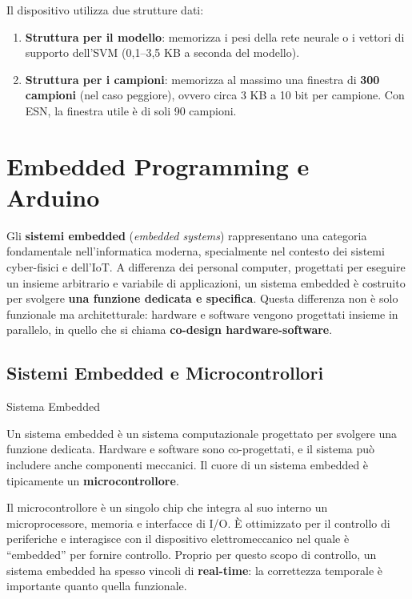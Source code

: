 \documentclass[
  italian,
  openany]{book}
\providecommand{\tightlist}{%
  \setlength{\itemsep}{0pt}\setlength{\parskip}{0pt}}
\begin{document}
Il dispositivo utilizza due strutture dati:

\begin{enumerate}
\def\labelenumi{\arabic{enumi}.}
\tightlist
\item
  \textbf{Struttura per il modello}: memorizza i pesi della rete neurale
  o i vettori di supporto dell'SVM (0,1--3,5 KB a seconda del modello).
\item
  \textbf{Struttura per i campioni}: memorizza al massimo una finestra
  di \textbf{300 campioni} (nel caso peggiore), ovvero circa 3 KB a 10
  bit per campione. Con ESN, la finestra utile è di soli 90 campioni.
\end{enumerate}

\newpage

\chapter{Embedded Programming e
Arduino}\label{embedded-programming-e-arduino}

Gli \textbf{sistemi embedded} (\emph{embedded systems}) rappresentano
una categoria fondamentale nell'informatica moderna, specialmente nel
contesto dei sistemi cyber-fisici e dell'IoT. A differenza dei personal
computer, progettati per eseguire un insieme arbitrario e variabile di
applicazioni, un sistema embedded è costruito per svolgere \textbf{una
funzione dedicata e specifica}. Questa differenza non è solo funzionale
ma architetturale: hardware e software vengono progettati insieme in
parallelo, in quello che si chiama \textbf{co-design hardware-software}.

\section{Sistemi Embedded e
Microcontrollori}\label{sistemi-embedded-e-microcontrollori}

\begin{calloutdefinition}{Sistema Embedded}

Un sistema embedded è un sistema computazionale progettato per svolgere
una funzione dedicata. Hardware e software sono co-progettati, e il
sistema può includere anche componenti meccanici. Il cuore di un sistema
embedded è tipicamente un \textbf{microcontrollore}.

\end{calloutdefinition}

Il microcontrollore è un singolo chip che integra al suo interno un
microprocessore, memoria e interfacce di I/O. È ottimizzato per il
controllo di periferiche e interagisce con il dispositivo
elettromeccanico nel quale è ``embedded'' per fornire controllo. Proprio
per questo scopo di controllo, un sistema embedded ha spesso vincoli di
\textbf{real-time}: la correttezza temporale è importante quanto quella
funzionale.
\end{document}
